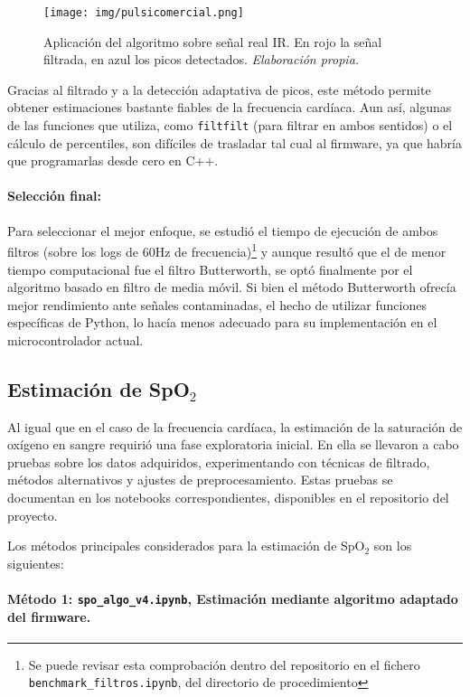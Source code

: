 \begin{figure}[H]
    \centering
    \texttt{[image: img/pulsicomercial.png]}
    \caption{Aplicación del algoritmo sobre señal real IR. En rojo la señal filtrada, en azul los picos detectados. \textit{Elaboración propia.}}
    \label{fig:pulsicomercial}
\end{figure}

Gracias al filtrado y a la detección adaptativa de picos, este método permite obtener estimaciones bastante fiables de la frecuencia cardíaca. Aun así, algunas de las funciones que utiliza, como \texttt{filtfilt} (para filtrar en ambos sentidos) o el cálculo de percentiles, son difíciles de trasladar tal cual al firmware, ya que habría que programarlas desde cero en C++. 


\paragraph{Selección final:}

Para seleccionar el mejor enfoque, se estudió el tiempo de ejecución de ambos filtros (sobre los logs de 60Hz de frecuencia)\footnote{Se puede revisar esta comprobación dentro del repositorio en el fichero \texttt{benchmark\_filtros.ipynb}, del directorio de procedimiento} y aunque resultó que el de menor tiempo computacional fue el filtro Butterworth, se optó finalmente por el algoritmo basado en filtro de media móvil. Si bien el método Butterworth ofrecía mejor rendimiento ante señales contaminadas, el hecho de utilizar funciones específicas de Python, lo hacía menos adecuado para su implementación en el microcontrolador actual.



\subsection{Estimación de SpO$_2$}

Al igual que en el caso de la frecuencia cardíaca, la estimación de la saturación de oxígeno en sangre requirió una fase exploratoria inicial. En ella se llevaron a cabo pruebas sobre los datos adquiridos, experimentando con técnicas de filtrado, métodos alternativos y ajustes de preprocesamiento. Estas pruebas se documentan en los notebooks correspondientes, disponibles en el repositorio del proyecto.

Los métodos principales considerados para la estimación de SpO$_2$ son los siguientes:

\paragraph{Método 1: \texttt{spo\_algo\_v4.ipynb}, Estimación mediante algoritmo adaptado del firmware.}

